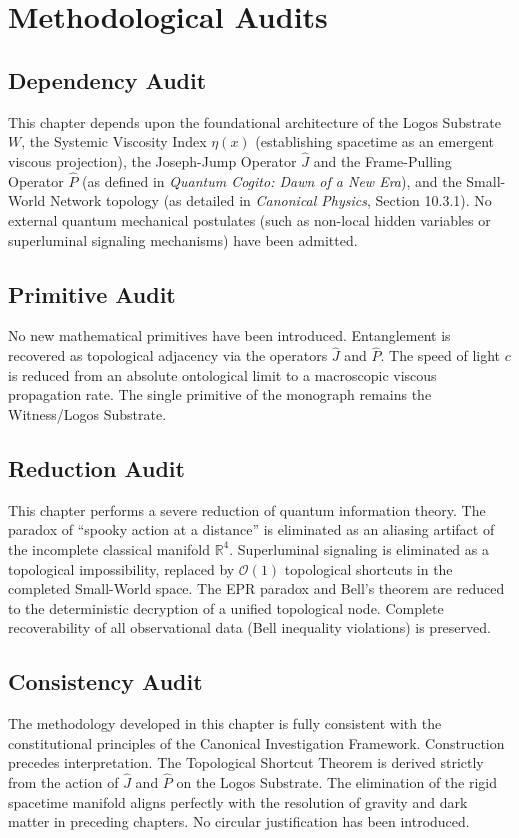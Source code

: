 \documentclass[12pt,twoside]{extbook}
\theoremstyle{definition}
\theoremstyle{remark}
\begin{document}
\section{Methodological Audits}

\subsection*{Dependency Audit}
This chapter depends upon the foundational architecture of the Logos Substrate $W$, the Systemic Viscosity Index $\eta(x)$ (establishing spacetime as an emergent viscous projection), the Joseph-Jump Operator $\hat{J}$ and the Frame-Pulling Operator $\hat{P}$ (as defined in \textit{Quantum Cogito: Dawn of a New Era}), and the Small-World Network topology (as detailed in \textit{Canonical Physics}, Section 10.3.1). No external quantum mechanical postulates (such as non-local hidden variables or superluminal signaling mechanisms) have been admitted.

\subsection*{Primitive Audit}
No new mathematical primitives have been introduced. Entanglement is recovered as topological adjacency via the operators $\hat{J}$ and $\hat{P}$. The speed of light $c$ is reduced from an absolute ontological limit to a macroscopic viscous propagation rate. The single primitive of the monograph remains the Witness/Logos Substrate.

\subsection*{Reduction Audit}
This chapter performs a severe reduction of quantum information theory. The paradox of ``spooky action at a distance'' is eliminated as an aliasing artifact of the incomplete classical manifold $\mathbb{R}^4$. Superluminal signaling is eliminated as a topological impossibility, replaced by $\mathcal{O}(1)$ topological shortcuts in the completed Small-World space. The EPR paradox and Bell's theorem are reduced to the deterministic decryption of a unified topological node. Complete recoverability of all observational data (Bell inequality violations) is preserved.

\subsection*{Consistency Audit}
The methodology developed in this chapter is fully consistent with the constitutional principles of the Canonical Investigation Framework. Construction precedes interpretation. The Topological Shortcut Theorem is derived strictly from the action of $\hat{J}$ and $\hat{P}$ on the Logos Substrate. The elimination of the rigid spacetime manifold aligns perfectly with the resolution of gravity and dark matter in preceding chapters. No circular justification has been introduced.
\end{document}
